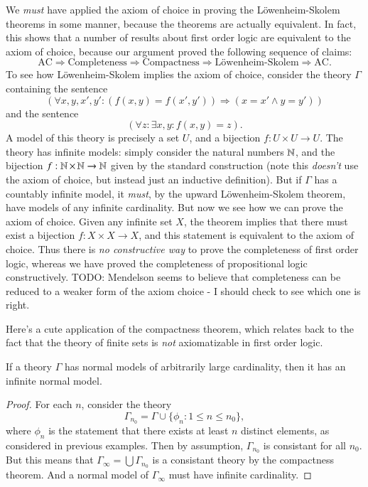 We \emph{must} have applied the axiom of choice in proving the L\"{o}wenheim-Skolem theorems in some manner, because the theorems are actually equivalent. In fact, this shows that a number of results about first order logic are equivalent to the axiom of choice, because our argument proved the following sequence of claims:
%
\[ \text{AC} \Rightarrow \text{Completeness} \Rightarrow \text{Compactness} \Rightarrow \text{L\"{o}wenheim-Skolem} \Rightarrow \text{AC}. \]
%
To see how L\"{o}wenheim-Skolem implies the axiom of choice, consider the theory $\Gamma$ containing the sentence
%
\[ (\forall x,y,x',y' : (f(x,y) = f(x',y')) \Rightarrow (x = x' \wedge y = y')  ) \]
%
and the sentence
%
\[ (\forall z : \exists x,y : f(x,y) = z). \]
%
A model of this theory is precisely a set $U$, and a bijection $f: U \times U \to U$. The theory has infinite models: simply consider the natural numbers $\operatorname{\mathbb{N}}$, and the bijection $f: \operatorname{\mathbb{N}} \times \operatorname{\mathbb{N}} \to \operatorname{\mathbb{N}}$ given by the standard construction (note this \emph{doesn't} use the axiom of choice, but instead just an inductive definition). But if $\Gamma$ has a countably infinite model, it \emph{must}, by the upward L\"{o}wenheim-Skolem theorem, have models of any infinite cardinality. But now we see how we can prove the axiom of choice. Given any infinite set $X$, the theorem implies that there must exist a bijection $f: X \times X \to X$, and this statement is equivalent to the axiom of choice. Thus there is \emph{no constructive way} to prove the completeness of first order logic, whereas we have proved the completeness of propositional logic constructively. TODO: Mendelson seems to believe that completeness can be reduced to a weaker form of the axiom choice - I should check to see which one is right.

Here's a cute application of the compactness theorem, which relates back to the fact that the theory of finite sets is \emph{not} axiomatizable in first order logic.

\begin{theorem}
    If a theory $\Gamma$ has normal models of arbitrarily large cardinality, then it has an infinite normal model.
\end{theorem}
\begin{proof}
    For each $n$, consider the theory
    \[ \Gamma_{n_0} = \Gamma \cup \{ \phi_n : 1 \leq n \leq n_0 \}, \]
    where $\phi_n$ is the statement that there exists at least $n$ distinct elements, as considered in previous examples. Then by assumption, $\Gamma_{n_0}$ is consistant for all $n_0$. But this means that $\Gamma_\infty = \bigcup \Gamma_{n_0}$ is a consistant theory by the compactness theorem. And a normal model of $\Gamma_\infty$ must have infinite cardinality.
\end{proof}

